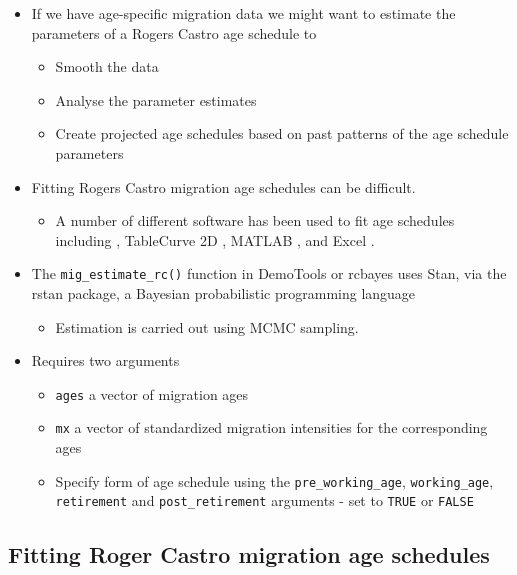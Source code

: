 \documentclass[
]{book}
\providecommand{\tightlist}{%
  \setlength{\itemsep}{0pt}\setlength{\parskip}{0pt}}
\begin{document}
\begin{itemize}
\tightlist
\item
  If we have age-specific migration data we might want to estimate the parameters of a Rogers Castro age schedule to

  \begin{itemize}
  \tightlist
  \item
    Smooth the data
  \item
    Analyse the parameter estimates
  \item
    Create projected age schedules based on past patterns of the age schedule parameters
  \end{itemize}
\item
  Fitting Rogers Castro migration age schedules can be difficult.

  \begin{itemize}
  \tightlist
  \item
    A number of different software has been used to fit age schedules including \citet{Rogers1994}, TableCurve 2D \citet{Rogers1999a}, MATLAB \citet{Rogers2010}, and Excel \citet{Wilson2010}.
  \end{itemize}
\item
  The \texttt{mig\_estimate\_rc()} function in DemoTools or rcbayes uses Stan, via the rstan package, a Bayesian probabilistic programming language

  \begin{itemize}
  \tightlist
  \item
    Estimation is carried out using MCMC sampling.
  \end{itemize}
\item
  Requires two arguments

  \begin{itemize}
  \tightlist
  \item
    \texttt{ages} a vector of migration ages
  \item
    \texttt{mx} a vector of standardized migration intensities for the corresponding ages
  \item
    Specify form of age schedule using the \texttt{pre\_working\_age}, \texttt{working\_age}, \texttt{retirement} and \texttt{post\_retirement} arguments - set to \texttt{TRUE} or \texttt{FALSE}
  \end{itemize}
\end{itemize}

\hypertarget{fitting-roger-castro-migration-age-schedules-1}{%
\subsection{Fitting Roger Castro migration age schedules}\label{fitting-roger-castro-migration-age-schedules-1}}
\end{document}
